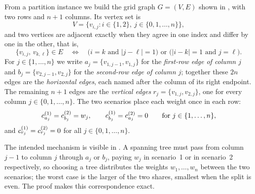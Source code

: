 From a partition instance we build the grid graph $G = (V, E)$ shown in , with two rows and $n + 1$ columns.
Its vertex set is
\[
V = \{v_{i,j} : i \in \{1, 2\},\ j \in \{0, 1, \ldots, n\}\},
\]
and two vertices are adjacent exactly when they agree in one index and differ by one in the other, that is,
\[
\{v_{i,j},\, v_{k,\ell}\} \in E
\quad\Longleftrightarrow\quad
\bigl(i = k \text{ and } |j - \ell| = 1\bigr)
\text{ or }
\bigl(|i - k| = 1 \text{ and } j = \ell\bigr).
\]
For $j \in \{1, \ldots, n\}$ we write $a_j = \{v_{1,j-1}, v_{1,j}\}$ for the \emph{first-row edge of column $j$} and $b_j = \{v_{2,j-1}, v_{2,j}\}$ for the \emph{second-row edge of column $j$}; together these $2n$ edges are the \emph{horizontal edges}, each named after the column of its right endpoint.
The remaining $n + 1$ edges are the \emph{vertical edges} $r_j = \{v_{1,j}, v_{2,j}\}$, one for every column $j \in \{0, 1, \ldots, n\}$.
The two scenarios place each weight once in each row:
\[
c^{(1)}_{a_j} = c^{(2)}_{b_j} = w_j,
\qquad
c^{(1)}_{b_j} = c^{(2)}_{a_j} = 0
\qquad
\text{for } j \in \{1, \ldots, n\},
\]
and $c^{(1)}_{r_j} = c^{(2)}_{r_j} = 0$ for all $j \in \{0, 1, \ldots, n\}$.

The intended mechanism is visible in .
A spanning tree must pass from column $j - 1$ to column $j$ through $a_j$ or $b_j$, paying $w_j$ in scenario~1 or in scenario~2 respectively, so choosing a tree distributes the weights $w_1, \ldots, w_n$ between the two scenarios; the worst case is the larger of the two shares, smallest when the split is even.
The proof makes this correspondence exact.

